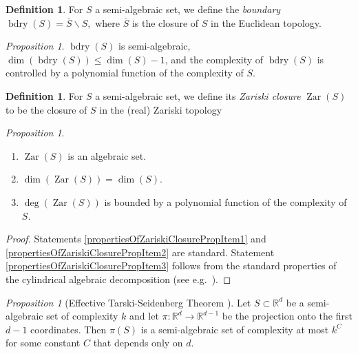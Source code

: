 \documentclass[reqno]{amsart}
\theoremstyle{definition}
\newtheorem{defn}[thm]{Definition}
\theoremstyle{remark}
\newtheorem{prop}[thm]{Proposition}
\theoremstyle{remark}
\newcommand{\RR}{\mathbb{R}}
\newcommand{\bdry}{\operatorname{bdry}}
\newcommand{\zar}{\operatorname{Zar}}
\begin{document}
\begin{defn}
For $S$ a semi-algebraic set, we define the \emph{boundary} $\bdry(S)=\overline S\backslash S,$ where $\overline S$ is the closure of $S$ in the Euclidean topology.
\end{defn}
\begin{prop}\label{propertiesOfTheBoundaryProp}
$\bdry(S)$ is semi-algebraic, $\dim(\bdry(S))\leq\dim(S)-1$, and the complexity of $\bdry(S)$ is controlled by a polynomial function of the complexity of $S$.
\end{prop}
%
\begin{defn}
For $S$ a semi-algebraic set, we define its \emph{Zariski closure} $\zar(S)$ to be the closure of $S$ in the (real) Zariski topology
\end{defn}
%
\begin{prop}\label{propertiesOfZariskiClosureProp}$\phantom{1}$
\begin{enumerate}[label=(\roman{*}), ref=(\roman{*})]%
\item\label{propertiesOfZariskiClosurePropItem1} $\zar(S)$ is an algebraic set.
\item\label{propertiesOfZariskiClosurePropItem2} $\dim(\zar(S))=\dim(S)$.
\item\label{propertiesOfZariskiClosurePropItem3} $\deg(\zar(S))$ is bounded by a polynomial function of the complexity of $S$.
\end{enumerate}
\end{prop}
\begin{proof}
Statements \ref{propertiesOfZariskiClosurePropItem1} and \ref{propertiesOfZariskiClosurePropItem2} are standard. Statement \ref{propertiesOfZariskiClosurePropItem3} follows from the standard properties of the cylindrical algebraic decomposition (see e.g.~\cite{Basu,Bochnak}).
\end{proof}
%
%
\begin{prop}[Effective Tarski-Seidenberg Theorem \cite{Collins}]\label{effectiveTarskiProp}
Let $S\subset\RR^d$ be a semi-algebraic set of complexity $k$ and let $\pi\colon \RR^d\to\RR^{d-1}$ be the projection onto the first $d-1$ coordinates. Then $\pi(S)$ is a semi-algebraic set of complexity at most $k^C$ for some constant $C$ that depends only on $d$.
\end{prop}
%
%

\end{document}
